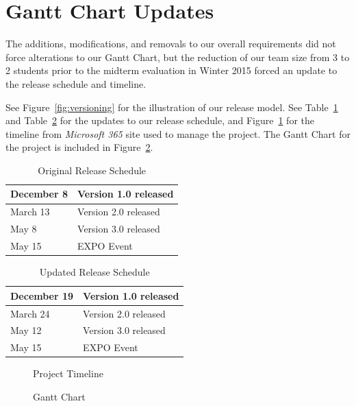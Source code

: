 \documentclass[11pt]{scrreprt}
\begin{document}
\section{Gantt Chart Updates}

The additions, modifications, and removals to our overall requirements did not force alterations to our Gantt Chart, but the reduction of our team size from 3 to 2 students prior to the midterm evaluation in Winter 2015 forced an update to the release schedule and timeline.

See Figure~\ref{fig:versioning} for the illustration of our release model.
See Table~\ref{original_release_schedule} and Table~\ref{updated_release_schedule} for the updates to our release schedule, and Figure~\ref{fig:timeline} for the timeline from \textit{Microsoft 365} site used to manage the project.
The Gantt Chart for the project is included in Figure~\ref{fig:gantt}.

\begin{longtable}{| p{} | p{} |}
\caption[Original Release Schedule]{Original Release Schedule} \label{original_release_schedule} \\
\hline
December 8 & Version 1.0 released\\
\hline
March 13 & Version 2.0 released\\
\hline
May 8 & Version 3.0 released\\
\hline
May 15 & EXPO Event\\
\hline
\end{longtable}

\begin{longtable}{| p{} | p{} |}
\caption[Updated Release Schedule]{Updated Release Schedule} \label{updated_release_schedule} \\
\hline
December 19 & Version 1.0 released\\
\hline
March 24 & Version 2.0 released\\
\hline
May 12 & Version 3.0 released\\
\hline
May 15 & EXPO Event\\
\hline
\end{longtable}

\begin{figure}[ht]
  \caption{Project Timeline}
  \label{fig:timeline}
\end{figure}

\begin{figure}[ht]
  \caption{Gantt Chart}
  \label{fig:gantt}
\end{figure}
\end{document}
